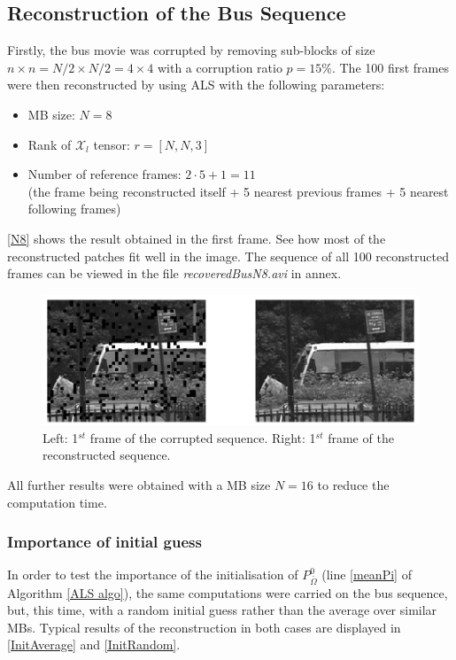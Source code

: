 \documentclass[a4paper, 11pt]{article} %
\def \t {\times}
\def \Xl {\mathcal{X}_{l}}
\def \bO{\bar{\Omega}}
\begin{document}
\subsection{Reconstruction of the Bus Sequence}
Firstly, the bus movie was corrupted by removing sub-blocks of size $n\t n=N/2\t N/2=4\t 4$ with a corruption ratio $p=15\%$.
The 100 first frames were then reconstructed by using ALS with the following parameters:
\begin{itemize}
\item MB size: $N=8$
\item Rank of $\Xl$ tensor: $r=[N, N, 3]$
\item Number of reference frames: $2\cdot 5+1=11$    \\ (the frame being reconstructed itself + 5 nearest previous frames + 5 nearest following frames)
\end{itemize}

\autoref{N8} shows the result obtained in the first frame. See how most of the reconstructed patches fit well in the image. The sequence of all 100 reconstructed frames can be viewed in the file \textit{recoveredBusN8.avi} in annex.

\begin{figure}[h!]
\centering
\includegraphics[scale=0.8]{myposter}
\caption{Left: 1$^{st}$ frame of the corrupted sequence. Right: 1$^{st}$ frame of the reconstructed sequence. \label{N8}}
\end{figure}
 
 All further results were obtained with a MB size $N=16$ to reduce the computation time.
 \subsubsection{Importance of initial guess }

In order to test the importance of the initialisation of $P^0_{\bO}$ (line \ref{meanPi} of Algorithm  \ref{ALS algo}), the same computations were carried on the bus sequence, but, this time, with a random initial guess rather than the average over similar MBs. Typical results of the reconstruction in both cases are displayed in \autoref{InitAverage} and \autoref{InitRandom}.
  
\end{document}
